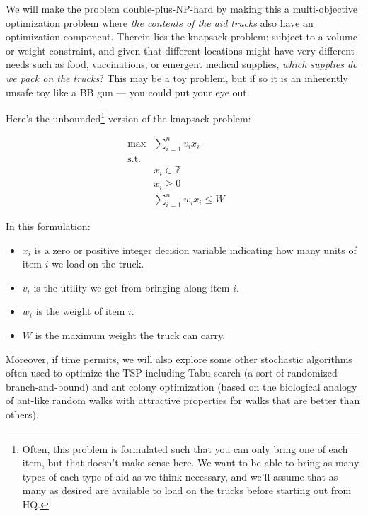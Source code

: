\documentclass{article} %
\begin{document}
We will make the problem double-plus-NP-hard by making this a multi-objective optimization problem
where \emph{the contents of the aid trucks} also have an optimization component. Therein lies
the knapsack problem: subject to a volume or weight constraint, and given that different locations
might have very different needs such as food, vaccinations, or emergent medical supplies, \emph{which
supplies do we pack on the trucks}?  This may be a toy problem, but if so it is an inherently unsafe
toy like a BB gun --- you could put your eye out.

Here's the unbounded\footnote{Often, this problem is formulated such that you can only bring one of
each item, but that doesn't make sense here. We want to be able to bring as many types of each type
of aid as we think necessary, and we'll assume that as many as desired are available to load on the
trucks before starting out from HQ.} version of the knapsack problem:

\begin{align*}
\max &\sum_{i=1}^n v_i x_i &&  \\
\mathrm{s.t.} & \\
    & x_i \in \mathbb{Z} \\
    & x_i \geq 0 \\
	& \sum_{i=1}^n w_ix_i \leq W
\end{align*}

In this formulation:

\begin{itemize}
  \item $x_{i}$ is a zero or positive integer decision variable indicating how many units of item $i$
        we load on the truck.
  \item $v_i$ is the utility we get from bringing along item $i$.
  \item $w_i$ is the weight of item $i$.
  \item $W$ is the maximum weight the truck can carry.
\end{itemize}

Moreover, if time permits, we will also explore some other stochastic algorithms often used to
optimize the TSP including Tabu search (a sort of randomized branch-and-bound) and ant colony
optimization (based on the biological analogy of ant-like random walks with attractive
properties for walks that are better than others).
\end{document}

